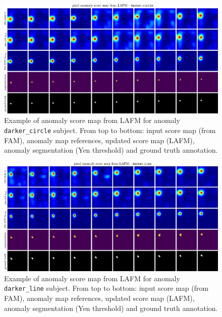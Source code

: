 \begin{figure}[htbp]
  \centering
  \includegraphics[width=0.75\linewidth]{figures/app-lafm-darkercircle.pdf}
  \caption[Example: anomaly segmentation from LAFM - \texttt{darker\_circle}]{Example of anomaly score map from LAFM for anomaly \texttt{darker\_circle} subject. From top to bottom: input score map (from FAM), anomaly map references, updated score map (LAFM), anomaly segmentation (Yen threshold) and ground truth annotation.}
\end{figure}

\begin{figure}[htbp]
  \centering
  \includegraphics[width=0.75\linewidth]{figures/app-lafm-darkerline.pdf}
  \caption[Example: anomaly segmentation from LAFM - \texttt{darker\_line}]{Example of anomaly score map from LAFM for anomaly \texttt{darker\_line} subject. From top to bottom: input score map (from FAM), anomaly map references, updated score map (LAFM), anomaly segmentation (Yen threshold) and ground truth annotation.}
\end{figure}
\FloatBarrier

